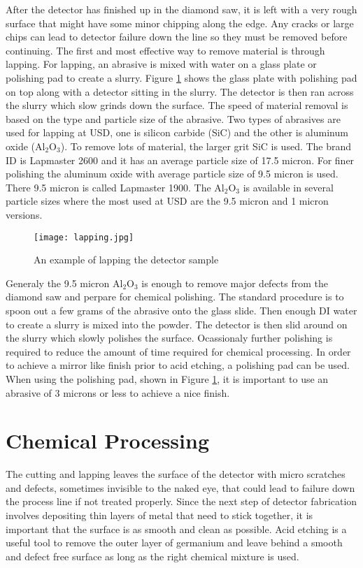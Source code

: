 After the detector has finished up in the diamond saw, it is left with a very rough surface that might have some minor chipping along the edge.
Any cracks or large chips can lead to detector failure down the line so they must be removed before continuing.
The first and most effective way to remove material is through lapping.
For lapping, an abrasive is mixed with water on a glass plate or polishing pad to create a slurry.
Figure \ref{fig:lapping} shows the glass plate with polishing pad on top along with a detector sitting in the slurry.
The detector is then ran across the slurry which slow grinds down the surface.
The speed of material removal is based on the type and particle size of the abrasive.
Two types of abrasives are used for lapping at USD, one is silicon carbide (SiC) and the other is aluminum oxide (Al$_2$O$_3$).
To remove lots of material, the larger grit SiC is used.
The brand ID is Lapmaster 2600 and it has an average particle size of 17.5 micron.
For finer polishing the aluminum oxide with average particle size of 9.5 micron is used.
There 9.5 micron is called Lapmaster 1900.
The Al$_2$O$_3$ is available in several particle sizes where the most used at USD are the 9.5 micron and 1 micron versions.
\begin{figure}[htpb]
\centering
\texttt{[image: lapping.jpg]}
\caption{An example of lapping the detector sample}
\label{fig:lapping}
\end{figure}
Generaly the 9.5 micron Al$_2$O$_3$ is enough to remove major defects from the diamond saw and perpare for chemical polishing.
The standard procedure is to spoon out a few grams of the abrasive onto the glass slide.
Then enough DI water to create a slurry is mixed into the powder.
The detector is then slid around on the slurry which slowly polishes the surface.
Ocassionaly further polishing is required to reduce the amount of time required for chemical processing.
In order to achieve a mirror like finish prior to acid etching, a polishing pad can be used.
When using the polishing pad, shown in Figure \ref{fig:lapping}, it is important to use an abrasive of 3 microns or less to achieve a nice finish.
\section{Chemical Processing}

The cutting and lapping leaves the surface of the detector with micro scratches and defects, sometimes invisible to the naked eye, that could lead to failure down the process line if not treated properly.
Since the next step of detector fabrication involves depositing thin layers of metal that need to stick together, it is important that the surface is as smooth and clean as possible.
Acid etching is a useful tool to remove the outer layer of germanium and leave behind a smooth and defect free surface as long as the right chemical mixture is used.  

